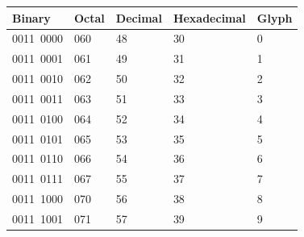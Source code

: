 \documentclass{article}
\begin{document}
\begin{tabular}{lllll}
\toprule
Binary & Octal & Decimal & Hexadecimal & Glyph \\
\midrule
0011 0000 & 060 & 48 & 30 & 0 \\
0011 0001 & 061 & 49 & 31 & 1 \\
0011 0010 & 062 & 50 & 32 & 2 \\
0011 0011 & 063 & 51 & 33 & 3 \\
0011 0100 & 064 & 52 & 34 & 4 \\
0011 0101 & 065 & 53 & 35 & 5 \\
0011 0110 & 066 & 54 & 36 & 6 \\
0011 0111 & 067 & 55 & 37 & 7 \\
0011 1000 & 070 & 56 & 38 & 8 \\
0011 1001 & 071 & 57 & 39 & 9 \\
\bottomrule
\end{tabular}
\end{document}
